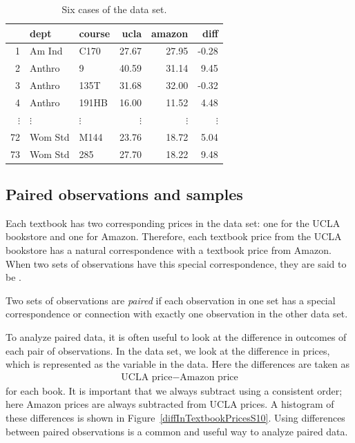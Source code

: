 \begin{table}[h]
\centering
\begin{tabular}{rllrrr}
  \hline
 & dept & course & ucla & amazon & diff \\ 
  \hline
1 & Am Ind &  C170 & 27.67 & 27.95 & -0.28 \\ 
  2 & Anthro & 9 & 40.59 & 31.14 & 9.45 \\ 
  3 & Anthro & 135T & 31.68 & 32.00 & -0.32 \\ 
  4 & Anthro & 191HB & 16.00 & 11.52 & 4.48 \\ 
$\vdots$ & $\vdots$ & $\vdots$ & $\vdots$ & $\vdots$ & $\vdots$ \\
  72 & Wom Std & M144 & 23.76 & 18.72 & 5.04 \\ 
  73 & Wom Std & 285 & 27.70 & 18.22 & 9.48 \\ 
   \hline
\end{tabular}
\caption{Six cases of the  data set.}
\label{textbooksDF}
\end{table}

\subsection{Paired observations and samples}

Each textbook has two corresponding prices in the data set: one for the UCLA bookstore and one for Amazon. Therefore, each textbook price from the UCLA bookstore has a natural correspondence with a textbook price from Amazon. When two sets of observations have this special correspondence, they are said to be .

\begin{termBox}{
Two sets of observations are \emph{paired} if each observation in one set has a special correspondence or connection with exactly one observation in the other data set.}
\end{termBox}

To analyze paired data, it is often useful to look at the difference in outcomes of each pair of observations. In the  data set, we look at the difference in prices, which is represented as the  variable in the  data. Here the differences are taken as
\begin{eqnarray*}
\text{UCLA price} - \text{Amazon price}
\end{eqnarray*}
for each book. It is important that we always subtract using a consistent order; here Amazon prices are always subtracted from UCLA prices. A histogram of these differences is shown in Figure~\ref{diffInTextbookPricesS10}. Using differences between paired observations is a common and useful way to analyze paired data.

